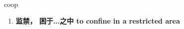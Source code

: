 
\begin{frame}
{\huge coop}
\begin{center}
\begin{enumerate}\Large
  \item \textbf{监禁， 困于...之中 to confine in a restricted area}
\end{enumerate}
\end{center}
\end{frame}
